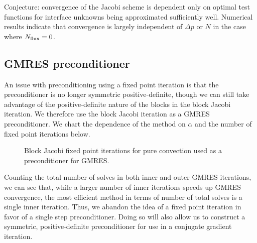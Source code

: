 \documentclass{article}
\begin{document}
Conjecture: convergence of the Jacobi scheme is dependent only on optimal test functions for interface unknowns being approximated sufficiently well.  Numerical results indicate that convergence is largely independent of $\Delta p$ or $N$ in the case where $N_{\rm flux} = 0$.  

\subsection{GMRES preconditioner}

An issue with preconditioning using a fixed point iteration is that the preconditioner is no longer symmetric positive-definite, though we can still take advantage of the positive-definite nature of the blocks in the block Jacobi iteration.  We therefore use the block Jacobi iteration as a GMRES preconditioner.  We chart the dependence of the method on $\alpha$ and the number of fixed point iterations below.  
\begin{figure}
\centering
{}
\caption{Block Jacobi fixed point iterations for pure convection used as a preconditioner for GMRES.}
\end{figure}
Counting the total number of solves in both inner and outer GMRES iterations, we can see that, while a larger number of inner iterations speeds up GMRES convergence, the most efficient method in terms of number of total solves is a single inner iteration.  Thus, we abandon the idea of a fixed point iteration in favor of a single step preconditioner.  Doing so will also allow us to construct a symmetric, positive-definite preconditioner for use in a conjugate gradient iteration.  
\end{document}
